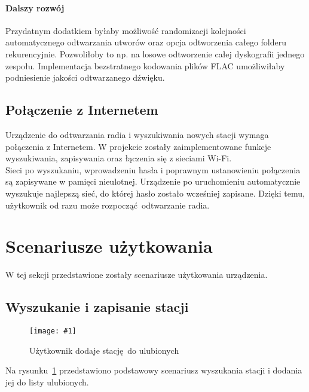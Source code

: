 \documentclass[12pt]{report}
\newcommand{\imgint}[4]{
	\begin{figure}[{#4}]
		\centering
		\texttt{[image: \#1]}
		\caption{#2}
		\label{#1}
	\end{figure}
}
\newcommand{\imgh}[3]{\imgint{#1}{#2}{#3}{H}}
\begin{document}
			\paragraph{Dalszy rozwój}
				Przydatnym dodatkiem byłaby możliwość randomizacji kolejności automatycznego odtwarzania utworów oraz opcja odtworzenia całego folderu rekurencyjnie. Pozwoliłoby to np. na losowe odtworzenie całej dyskografii jednego zespołu. Implementacja bezstratnego kodowania plików FLAC umożliwiłaby podniesienie jakości odtwarzanego dźwięku.
		
		\subsection{Połączenie z Internetem}
			Urządzenie do odtwarzania radia i wyszukiwania nowych stacji wymaga połączenia z Internetem. W projekcie zostały zaimplementowane funkcje wyszukiwania, zapisywania oraz łączenia się z sieciami Wi-Fi.
			$ $\\
			
			Sieci po wyszukaniu, wprowadzeniu hasła i poprawnym ustanowieniu połączenia są zapisywane w pamięci nieulotnej. Urządzenie po uruchomieniu automatycznie wyszukuje najlepszą sieć, do której hasło zostało wcześniej zapisane. Dzięki temu, użytkownik od razu może rozpocząć odtwarzanie radia.
	
	\section{Scenariusze użytkowania}
		W tej sekcji przedstawione zostały scenariusze użytkowania urządzenia.
	
		\subsection{Wyszukanie i zapisanie stacji}
			\imgh{5/PicoRadio-fl-add}{Użytkownik dodaje stację do ulubionych}{0.9}
			\newcommand{\rfladd}[1]{\ref{5/PicoRadio-fl-add}#1}
			
			Na rysunku~\rfladd{} przedstawiono podstawowy scenariusz wyszukania stacji i dodania jej do listy ulubionych.
			
\end{document}
